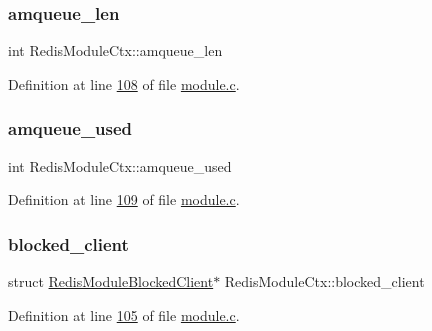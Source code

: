 \subsubsection{\texorpdfstring{amqueue\+\_\+len}{amqueue\_len}}
{\footnotesize\ttfamily int Redis\+Module\+Ctx\+::amqueue\+\_\+len}



Definition at line \hyperlink{module_8c_source_l00108}{108} of file \hyperlink{module_8c_source}{module.\+c}.

\mbox{\label{structRedisModuleCtx_aa38e50308a70dcc2b288352211ae38b8}} 
\subsubsection{\texorpdfstring{amqueue\+\_\+used}{amqueue\_used}}
{\footnotesize\ttfamily int Redis\+Module\+Ctx\+::amqueue\+\_\+used}



Definition at line \hyperlink{module_8c_source_l00109}{109} of file \hyperlink{module_8c_source}{module.\+c}.

\mbox{\label{structRedisModuleCtx_a77721d5d1e02aa3eb72262caf0533efc}} 
\subsubsection{\texorpdfstring{blocked\+\_\+client}{blocked\_client}}
{\footnotesize\ttfamily struct \hyperlink{structRedisModuleBlockedClient}{Redis\+Module\+Blocked\+Client}$\ast$ Redis\+Module\+Ctx\+::blocked\+\_\+client}



Definition at line \hyperlink{module_8c_source_l00105}{105} of file \hyperlink{module_8c_source}{module.\+c}.

\mbox{\label{structRedisModuleCtx_af9433f7f7fe6b2e2872034b0a00f0cd3}} 
